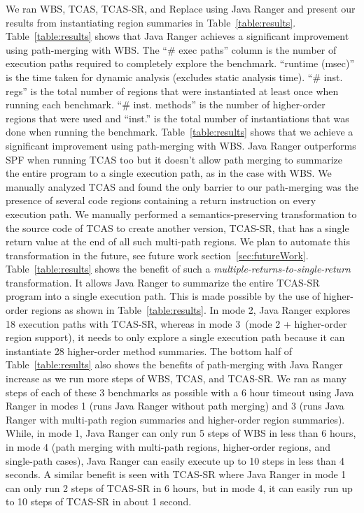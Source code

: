 We ran WBS, TCAS, TCAS-SR, and Replace using Java Ranger and present our results from instantiating region summaries
in Table~\ref{table:results}.
%
Table~\ref{table:results} shows that Java Ranger achieves a significant improvement using path-merging with WBS.
%
The ``\# exec paths'' column is the number of execution paths required to completely explore the benchmark.
%
``runtime (msec)'' is the time taken for dynamic analysis (excludes static analysis time).
%
``\# inst. regs'' is the total number of regions that were instantiated at least once when running each benchmark.
%
``\# inst. methods'' is the number of higher-order regions that were used and ``inst.'' is the total number of
instantiations that was done when running the benchmark.
%
Table~\ref{table:results} shows that we achieve a significant improvement using path-merging with WBS.
%
Java Ranger outperforms SPF when running TCAS too but it doesn't allow path merging to summarize the entire program
to a single execution path, as in the case with WBS.
%
We manually analyzed TCAS and found the only barrier to our path-merging was the presence of several code
regions containing a return instruction on every execution path.
%
We manually performed a semantics-preserving transformation to the source code of TCAS to create another version, TCAS-SR,
that has a single return value at the end of all such multi-path regions.
%
We plan to automate this transformation in the future, see future work section~\ref{sec:futureWork}.
%
Table~\ref{table:results} shows the benefit of such a \textit{multiple-returns-to-single-return} transformation.
%
It allows Java Ranger to summarize the entire TCAS-SR program into a single execution path.
%
This is made possible by the use of higher-order regions as shown in Table~\ref{table:results}.
%
In mode 2, Java Ranger explores 18 execution paths with TCAS-SR, whereas in mode 3~(mode 2 + higher-order region support), it needs to only explore a single
execution path because it can instantiate 28 higher-order method summaries.
%
The bottom half of Table~\ref{table:results} also shows the benefits of path-merging with Java Ranger increase as we run
more steps of WBS, TCAS, and TCAS-SR.
%
We ran as many steps of each of these 3 benchmarks as possible with a 6 hour timeout using Java Ranger in modes
1 (runs Java Ranger without path merging) and 3 (runs Java Ranger with multi-path region summaries and higher-order region summaries).
%
While, in mode 1, Java Ranger can only run 5 steps of WBS in less than 6 hours, in mode 4 (path merging with multi-path regions, higher-order regions, and single-path cases),
Java Ranger can easily execute up to 10 steps in less than 4 seconds.
%
A similar benefit is seen with TCAS-SR where Java Ranger in mode 1 can only run 2 steps of TCAS-SR in 6 hours, but in
mode 4, it can easily run up to 10 steps of TCAS-SR in about 1 second.

